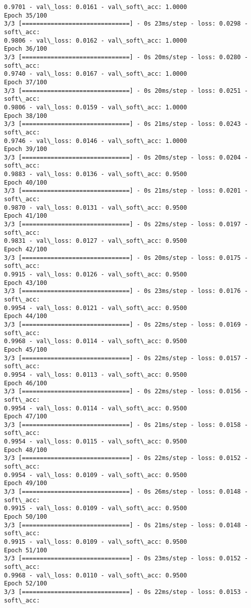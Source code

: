 \documentclass[11pt]{article}
\begin{document}
\begin{Verbatim}[commandchars=\\\{\}]
0.9701 - val\_loss: 0.0161 - val\_soft\_acc: 1.0000
Epoch 35/100
3/3 [==============================] - 0s 23ms/step - loss: 0.0298 - soft\_acc:
0.9806 - val\_loss: 0.0162 - val\_soft\_acc: 1.0000
Epoch 36/100
3/3 [==============================] - 0s 20ms/step - loss: 0.0280 - soft\_acc:
0.9740 - val\_loss: 0.0167 - val\_soft\_acc: 1.0000
Epoch 37/100
3/3 [==============================] - 0s 20ms/step - loss: 0.0251 - soft\_acc:
0.9806 - val\_loss: 0.0159 - val\_soft\_acc: 1.0000
Epoch 38/100
3/3 [==============================] - 0s 21ms/step - loss: 0.0243 - soft\_acc:
0.9746 - val\_loss: 0.0146 - val\_soft\_acc: 1.0000
Epoch 39/100
3/3 [==============================] - 0s 20ms/step - loss: 0.0204 - soft\_acc:
0.9883 - val\_loss: 0.0136 - val\_soft\_acc: 0.9500
Epoch 40/100
3/3 [==============================] - 0s 21ms/step - loss: 0.0201 - soft\_acc:
0.9870 - val\_loss: 0.0131 - val\_soft\_acc: 0.9500
Epoch 41/100
3/3 [==============================] - 0s 22ms/step - loss: 0.0197 - soft\_acc:
0.9831 - val\_loss: 0.0127 - val\_soft\_acc: 0.9500
Epoch 42/100
3/3 [==============================] - 0s 20ms/step - loss: 0.0175 - soft\_acc:
0.9915 - val\_loss: 0.0126 - val\_soft\_acc: 0.9500
Epoch 43/100
3/3 [==============================] - 0s 23ms/step - loss: 0.0176 - soft\_acc:
0.9954 - val\_loss: 0.0121 - val\_soft\_acc: 0.9500
Epoch 44/100
3/3 [==============================] - 0s 22ms/step - loss: 0.0169 - soft\_acc:
0.9968 - val\_loss: 0.0114 - val\_soft\_acc: 0.9500
Epoch 45/100
3/3 [==============================] - 0s 22ms/step - loss: 0.0157 - soft\_acc:
0.9954 - val\_loss: 0.0113 - val\_soft\_acc: 0.9500
Epoch 46/100
3/3 [==============================] - 0s 22ms/step - loss: 0.0156 - soft\_acc:
0.9954 - val\_loss: 0.0114 - val\_soft\_acc: 0.9500
Epoch 47/100
3/3 [==============================] - 0s 21ms/step - loss: 0.0158 - soft\_acc:
0.9954 - val\_loss: 0.0115 - val\_soft\_acc: 0.9500
Epoch 48/100
3/3 [==============================] - 0s 22ms/step - loss: 0.0152 - soft\_acc:
0.9954 - val\_loss: 0.0109 - val\_soft\_acc: 0.9500
Epoch 49/100
3/3 [==============================] - 0s 26ms/step - loss: 0.0148 - soft\_acc:
0.9915 - val\_loss: 0.0109 - val\_soft\_acc: 0.9500
Epoch 50/100
3/3 [==============================] - 0s 21ms/step - loss: 0.0148 - soft\_acc:
0.9915 - val\_loss: 0.0109 - val\_soft\_acc: 0.9500
Epoch 51/100
3/3 [==============================] - 0s 23ms/step - loss: 0.0152 - soft\_acc:
0.9968 - val\_loss: 0.0110 - val\_soft\_acc: 0.9500
Epoch 52/100
3/3 [==============================] - 0s 22ms/step - loss: 0.0153 - soft\_acc:

\end{Verbatim}
\end{document}
